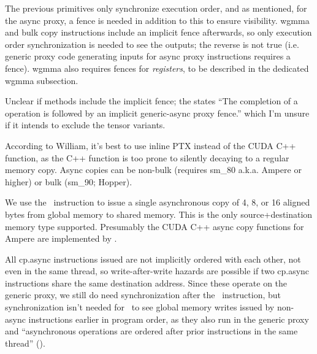 \filbreak
{} The previous primitives only synchronize execution order, and as mentioned, for the async proxy, a fence is needed in addition to this to ensure visibility.
wgmma and bulk copy instructions include an implicit fence afterwards, so only execution order synchronization is needed to see the outputs; the reverse is not true (i.e. generic proxy code generating inputs for async proxy instructions requires a fence).
wgmma also requires fences for \textit{registers}, to be described in the dedicated wgmma subsection.

 Unclear if  methods include the implicit fence; the  states ``The completion of a  operation is followed by an implicit generic-async proxy fence.'' which I'm unsure if it intends to exclude the tensor variants.

\filbreak
{}

According to William, it's best to use inline PTX instead of the CUDA C++  function, as the C++ function is too prone to silently decaying to a regular memory copy. Async copies can be non-bulk (requires sm\_80 a.k.a. Ampere or higher) or bulk (sm\_90; Hopper).

\filbreak
{} We use the \cpAsync\ instruction to issue a single asynchronous copy of 4, 8, or 16 aligned bytes from global memory to shared memory. This is the only source+destination memory type supported. Presumably the CUDA C++ async copy functions for Ampere are implemented by .

All cp.async instructions issued are not implicitly ordered with each other, not even in the same thread, so write-after-write hazards are possible if two cp.async instructions share the same destination address. Since these operate on the generic proxy, we still do need synchronization after the \cpAsync\ instruction, but synchronization isn't needed for \cpAsync\ to see global memory writes issued by non-async instructions earlier in program order, as they also run in the generic proxy and ``asynchronous operations are ordered after prior instructions in the same thread'' ().

